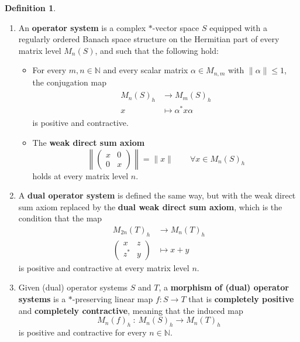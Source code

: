 \documentclass[11pt,onecolumn]{article}
\newcommand{\N}{\mathbb{N}}
\theoremstyle{plain}
\theoremstyle{remark}
\theoremstyle{definition}
\newtheorem{definition}[definition]{Definition}
\begin{document}
\begin{definition}
\label{def:os}
\label{def:dual_os}
\begin{enumerate}
	\item An \textbf{operator system} is a complex $*$-vector space $S$ equipped with a regularly ordered Banach space structure on the Hermitian part of every matrix level $M_n(S)$,
		and such that the following hold:
		\begin{itemize}
			\item For every $m,n \in \N$ and every scalar matrix $\alpha \in M_{n,m}$ with $\|\alpha\| \le 1$,
				the conjugation map
				\begin{align}
					\label{eq:conjugation_map}
					\begin{split}
						M_n(S)_h & \longrightarrow M_m(S)_h \\
						x & \longmapsto \alpha^* x \alpha
					\end{split}
				\end{align}
				is positive and contractive.
			\item The \textbf{weak direct sum axiom}
				\begin{equation}
					\label{eq:weak_direct_sum_axiom}
					\left\|
					\begin{pmatrix}
						x & 0 \\
						0 & x
					\end{pmatrix}
					\right\|
					=
					\|x\|
					\qquad
					\forall x \in M_n(S)_h
				\end{equation}
				holds at every matrix level $n$.
		\end{itemize}
	\item A \textbf{dual operator system} is defined the same way, but with the weak direct sum axiom replaced by the \textbf{dual weak direct sum axiom},
		which is the condition that the map
		\begin{align*}
			M_{2n}(T)_h & \longrightarrow M_n(T)_h \\
			\begin{pmatrix}
				x & z \\
				z^* & y
			\end{pmatrix}
				    & \longmapsto x+y
		\end{align*}
		is positive and contractive at every matrix level $n$.
	\item Given (dual) operator systems $S$ and $T$, a \textbf{morphism of (dual) operator systems} is a $*$-preserving linear map $f : S \to T$
		that is \textbf{completely positive} and \textbf{completely contractive},
		meaning that the induced map
		\[
			M_n(f)_h \: : \: M_n(S)_h \longrightarrow M_n(T)_h
		\]
		is positive and contractive for every $n \in \N$.
\end{enumerate}
\end{definition}
\end{document}
